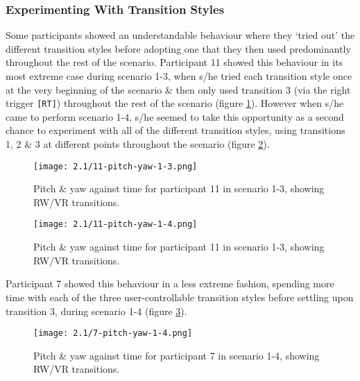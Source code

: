 
\subsubsection{Experimenting With Transition Styles}

Some participants showed an understandable behaviour where they `tried out' the different transition styles before adopting one that they then used predominantly throughout the rest of the scenario. Participant 11 showed this behaviour in its most extreme case during scenario 1-3, when s/he tried each transition style once at the very beginning of the scenario \& then only used transition 3 (via the right trigger \texttt{[RT]}) throughout the rest of the scenario (figure \ref{11-pitch-yaw-1-3.png}). However when s/he came to perform scenario 1-4, s/he seemed to take this opportunity as a second chance to experiment with all of the different transition styles, using transitions 1, 2 \& 3 at different points throughout the scenario (figure \ref{11-pitch-yaw-1-4.png}).

\begin{figure}[h]
	\begin{center}
	\texttt{[image: 2.1/11-pitch-yaw-1-3.png]}
	\caption{Pitch \& yaw against time for participant 11 in scenario 1-3, showing RW/VR transitions.}
	\label{11-pitch-yaw-1-3.png}
	\end{center}
\end{figure}

\begin{figure}[h]
	\begin{center}
	\texttt{[image: 2.1/11-pitch-yaw-1-4.png]}
	\caption{Pitch \& yaw against time for participant 11 in scenario 1-3, showing RW/VR transitions.}
	\label{11-pitch-yaw-1-4.png}
	\end{center}
\end{figure}

Participant 7 showed this behaviour in a less extreme fashion, spending more time with each of the three user-controllable transition styles before settling upon transition 3, during scenario 1-4 (figure \ref{7-pitch-yaw-1-4.png}).

\begin{figure}[h]
	\begin{center}
	\texttt{[image: 2.1/7-pitch-yaw-1-4.png]}
	\caption{Pitch \& yaw against time for participant 7 in scenario 1-4, showing RW/VR transitions.}
	\label{7-pitch-yaw-1-4.png}
	\end{center}
\end{figure}

